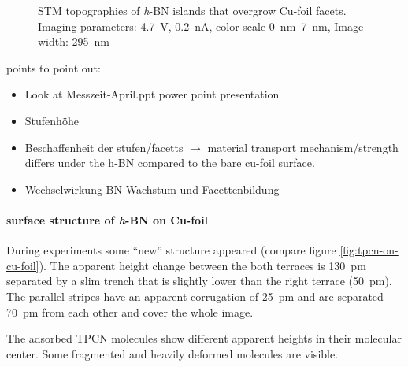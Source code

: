 \begin{figure}
	\centering
	 \quad %
	\caption{STM topographies of \textit{h}-BN islands that overgrow Cu-foil facets. Imaging parameters: 		
\SI{4.7}{\volt}, \SI{0.2}{\nano\ampere}, color scale \SIrange{0}{7}{\nano\meter}, Image width: \SI{295}{\nano \meter}
	}%
	\label{fig:h-bn-overgrown-cu}
\end{figure}
points to point out:
\begin{itemize}
 \item Look at Messzeit-April.ppt power point presentation
 \item Stufenh\"ohe
 \item Beschaffenheit der stufen/facetts $\rightarrow$ material transport mechanism/strength differs under the h-BN compared to the bare cu-foil surface.
 \item Wechselwirkung BN-Wachstum und Facettenbildung
\end{itemize}


\paragraph{surface structure of \textit{h}-BN on Cu-foil}
During experiments some ``new'' structure appeared (compare figure \ref{fig:tpcn-on-cu-foil}).
The apparent height change between the both terraces is \SI{130}{\pico \meter} separated by a slim trench that is slightly lower than the right terrace (\SI{50}{\pico \meter}). The parallel stripes have an apparent corrugation of \SI{25}{\pico \meter} and are separated \SI{70}{\pico \meter} from each other and cover the whole image. 

The adsorbed TPCN molecules show different apparent heights in their molecular center. Some fragmented and heavily deformed molecules are visible.

